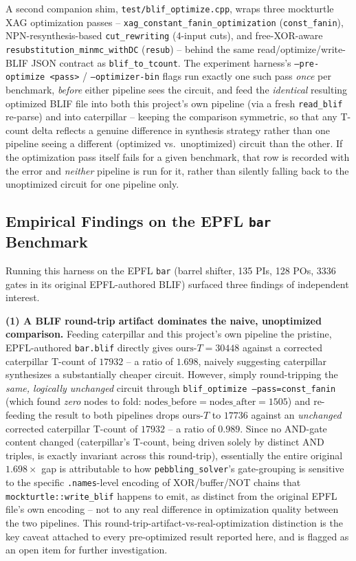 A second companion shim, \texttt{test/blif\_optimize.cpp}, wraps
three mockturtle XAG optimization passes --
\texttt{xag\_constant\_fanin\_optimization} (\texttt{const\_fanin}),
NPN-resynthesis-based \texttt{cut\_rewriting} (4-input cuts), and
free-XOR-aware \texttt{resubstitution\_minmc\_withDC}
(\texttt{resub}) -- behind the same read/optimize/write-BLIF JSON
contract as \texttt{blif\_to\_tcount}. The experiment harness's
\texttt{--pre-optimize \textless pass\textgreater} /
\texttt{--optimizer-bin} flags run exactly one such pass \emph{once}
per benchmark, \emph{before} either pipeline sees the circuit, and
feed the \emph{identical} resulting optimized BLIF file into both
this project's own pipeline (via a fresh \texttt{read\_blif} re-parse)
and into caterpillar -- keeping the comparison symmetric, so that any
T-count delta reflects a genuine difference in synthesis strategy
rather than one pipeline seeing a different (optimized vs.\
unoptimized) circuit than the other. If the optimization pass itself
fails for a given benchmark, that row is recorded with the error and
\emph{neither} pipeline is run for it, rather than silently falling
back to the unoptimized circuit for one pipeline only.

\subsection{Empirical Findings on the EPFL \texttt{bar} Benchmark}

Running this harness on the EPFL \texttt{bar} (barrel shifter, 135
PIs, 128 POs, 3336 gates in its original EPFL-authored BLIF) surfaced
three findings of independent interest.

\textbf{(1) A BLIF round-trip artifact dominates the naive,
unoptimized comparison.} Feeding caterpillar and this project's own
pipeline the pristine, EPFL-authored \texttt{bar.blif} directly gives
$\mathrm{ours}\text{-}T = 30448$ against a corrected caterpillar
T-count of $17932$ -- a ratio of $1.698$, naively suggesting
caterpillar synthesizes a substantially cheaper circuit. However,
simply round-tripping the \emph{same, logically unchanged} circuit
through \texttt{blif\_optimize --pass=const\_fanin} (which found
\emph{zero} nodes to fold: $\mathrm{nodes\_before} =
\mathrm{nodes\_after} = 1505$) and re-feeding the result to both
pipelines drops $\mathrm{ours}\text{-}T$ to $17736$ against an
\emph{unchanged} corrected caterpillar T-count of $17932$ -- a ratio
of $0.989$. Since no AND-gate content changed (caterpillar's T-count,
being driven solely by distinct AND triples, is exactly invariant
across this round-trip), essentially the entire original $1.698\times$
gap is attributable to how \texttt{pebbling\_solver}'s gate-grouping
is sensitive to the specific \texttt{.names}-level encoding of
XOR/buffer/NOT chains that \texttt{mockturtle::write\_blif} happens
to emit, as distinct from the original EPFL file's own encoding --
not to any real difference in optimization quality between the two
pipelines. This round-trip-artifact-vs-real-optimization distinction
is the key caveat attached to every pre-optimized result reported
here, and is flagged as an open item for further investigation.

